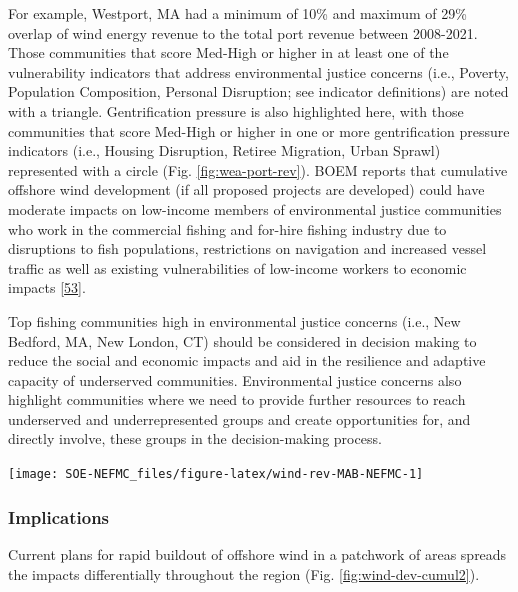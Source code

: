 \documentclass[
  10pt,
]{article}
\let\origfigure\figure
\let\endorigfigure\endfigure
\renewenvironment{figure}[1][2] {
    \expandafter\origfigure\expandafter[H]
} {
    \endorigfigure
}
\begin{document}
For example, Westport, MA had a minimum of 10\% and maximum of 29\% overlap of wind energy revenue to the total port revenue between 2008-2021. Those communities that score Med-High or higher in at least one of the vulnerability indicators that address environmental justice concerns (i.e., Poverty, Population Composition, Personal Disruption; see indicator definitions) are noted with a triangle. Gentrification pressure is also highlighted here, with those communities that score Med-High or higher in one or more gentrification pressure indicators (i.e., Housing Disruption, Retiree Migration, Urban Sprawl) represented with a circle (Fig. \ref{fig:wea-port-rev}). BOEM reports that cumulative offshore wind development (if all proposed projects are developed) could have moderate impacts on low-income members of environmental justice communities who work in the commercial fishing and for-hire fishing industry due to disruptions to fish populations, restrictions on navigation and increased vessel traffic as well as existing vulnerabilities of low-income workers to economic impacts {[}\protect\hyperlink{ref-boem_vineyard_2020}{53}{]}.

Top fishing communities high in environmental justice concerns (i.e., New Bedford, MA, New London, CT) should be considered in decision making to reduce the social and economic impacts and aid in the resilience and adaptive capacity of underserved communities. Environmental justice concerns also highlight communities where we need to provide further resources to reach underserved and underrepresented groups and create opportunities for, and directly involve, these groups in the decision-making process.

\begin{figure}

\texttt{[image: SOE-NEFMC\_files/figure-latex/wind-rev-MAB-NEFMC-1]} \hfill{}

\caption{Percent of Mid-Atlantic port revenue with majority NEFMC landings from Wind Energy Areas (WEA) in descending order from most to least port fisheries revenue from WEA. EJ = Environmental Justice.}\label{fig:wind-rev-MAB-NEFMC}
\end{figure}

\hypertarget{implications-7}{%
\subsubsection{Implications}\label{implications-7}}

Current plans for rapid buildout of offshore wind in a patchwork of areas spreads the impacts differentially throughout the region (Fig. \ref{fig:wind-dev-cumul2}).
\end{document}
